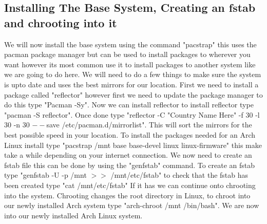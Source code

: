 \documentclass[titlepage]{article}
\begin{document}
   \subsection{Installing The Base System, Creating an fstab and chrooting into it}
  We will now install the base system using the command "pacstrap" this uses the pacman package manager but can be used to install packages to wherever you want however its most common use it to install packages to another system like we are going to do here. We will need to do a few things to make sure the system is upto date and uses the best mirrors for our location. First we need to install a package called "reflector" however first we need to update the package manager to do this type "Pacman -Sy". Now we can install reflector to install reflector type "pacman -S reflector". Once done type "reflector -C "Country Name Here" -f 30 -l 30 -n 30 $--$save /etc/pacman.d/mirrorlist". This will sort the mirrors for the best possible speed in your location. To install the packages needed for an Arch Linux install type "pacstrap /mnt base base-devel linux linux-firmware" this make take a while depending on your internet connection. We now need to create an fstab file this can be done by using the "genfstab" command. To create an fstab type "genfstab -U -p /mnt $>$$>$ /mnt/etc/fstab" to check that the fstab has been created type "cat /mnt/etc/fstab" If it has we can continue onto chrooting into the system. Chrooting changes the root directory
  in Linux, to chroot into our newly installed Arch system type "arch-chroot /mnt /bin/bash". We are now into our newly installed Arch Linux system.
  \vspace*{0.5 cm}
\end{document}
